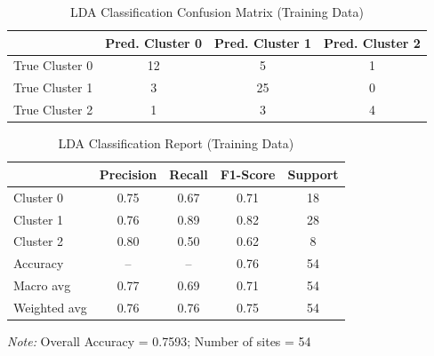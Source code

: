 
\begin{table}[htbp]
    \centering
    \caption{LDA Classification Confusion Matrix (Training Data)}
    \label{tab:03_lda_confusion}
    \small
    \begin{tabular}{lccc}
        \toprule
        & \textbf{Pred. Cluster 0} & \textbf{Pred. Cluster 1} & \textbf{Pred. Cluster 2} \\
        \midrule
        True Cluster 0 & 12 & 5 & 1 \\
        True Cluster 1 & 3 & 25 & 0 \\
        True Cluster 2 & 1 & 3 & 4 \\
        \bottomrule
    \end{tabular}
\end{table}

\begin{table}[htbp]
    \centering
    \caption{LDA Classification Report (Training Data)}
    \label{tab:03_lda_classification}
    \small
    \begin{tabular}{lcccc}
        \toprule
        & \textbf{Precision} & \textbf{Recall} & \textbf{F1-Score} & \textbf{Support} \\
        \midrule
        Cluster 0 & 0.75 & 0.67 & 0.71 & 18 \\
        Cluster 1 & 0.76 & 0.89 & 0.82 & 28 \\
        Cluster 2 & 0.80 & 0.50 & 0.62 & 8 \\
        \midrule
        Accuracy & -- & -- & 0.76 & 54 \\
        Macro avg & 0.77 & 0.69 & 0.71 & 54 \\
        Weighted avg & 0.76 & 0.76 & 0.75 & 54 \\
        \bottomrule
    \end{tabular}
    
    \vspace{0.5em}
    \footnotesize
    \textit{Note:} Overall Accuracy = 0.7593; Number of sites = 54
\end{table}

